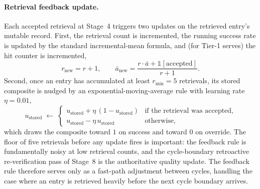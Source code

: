 \paragraph{Retrieval feedback update.}
Each accepted retrieval at Stage~4 triggers two updates on the retrieved entry's mutable record. First, the retrieval count is incremented, the running success rate is updated by the standard incremental-mean formula, and (for Tier-1 serves) the hit counter is incremented,
\begin{equation}
r_{\text{new}} = r + 1, \qquad \bar{a}_{\text{new}} = \frac{r \cdot \bar{a} + \mathbb{1}[\text{accepted}]}{r + 1}.
\label{eq:retrieval-stats}
\end{equation}
Second, once an entry has accumulated at least $r_{\min} = 5$ retrievals, its stored composite is nudged by an exponential-moving-average rule with learning rate $\eta = 0.01$,
\begin{equation}
u_{\text{stored}} \;\gets\;
\begin{cases}
u_{\text{stored}} + \eta\,(1 - u_{\text{stored}}) & \text{if the retrieval was accepted,} \\
u_{\text{stored}} - \eta\,u_{\text{stored}} & \text{otherwise,}
\end{cases}
\label{eq:feedback-update}
\end{equation}
which draws the composite toward $1$ on success and toward $0$ on override. The floor of five retrievals before any update fires is important: the feedback rule is fundamentally noisy at low retrieval counts, and the cycle-boundary retroactive re-verification pass of Stage~8 is the authoritative quality update. The feedback rule therefore serves only as a fast-path adjustment between cycles, handling the case where an entry is retrieved heavily before the next cycle boundary arrives.

